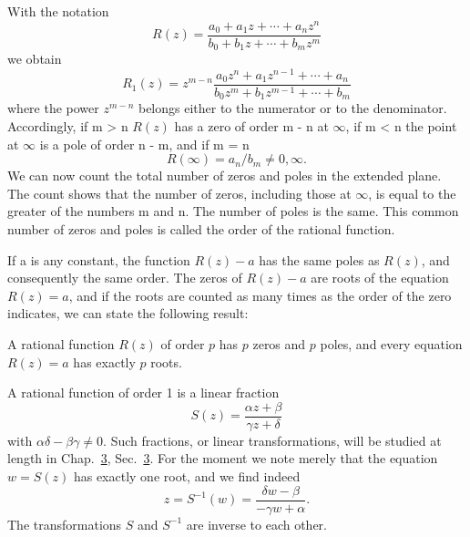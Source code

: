 With the notation
\begin{equation*}
R (z) = \frac {a _ {0} + a _ {1} z + \cdots + a _ {n} z ^ {n}}{b _ {0} + b _ {1} z + \cdots + b _ {m} z ^ {m}}
\end{equation*}
we obtain
\begin{equation*}
R _ {1} (z) = z ^ {m - n} \frac {a _ {0} z ^ {n} + a _ {1} z ^ {n - 1} + \cdots + a _ {n}}{b _ {0} z ^ {m} + b _ {1} z ^ {m - 1} + \cdots + b _ {m}}
\end{equation*}
where the power $z^{m-n}$ belongs either to the numerator or to the denominator. Accordingly, if m > n $R(z)$ has a zero of order m - n at $\infty$, if m < n the point at $\infty$ is a pole of order n - m, and if m = n
\begin{equation*}
R (\infty) = a _ {n} / b _ {m} \neq 0, \infty .
\end{equation*}
We can now count the total number of zeros and poles in the extended plane. The count shows that the number of zeros, including those at $\infty$, is equal to the greater of the numbers m and n. The number of poles is the same. This common number of zeros and poles is called the order of the rational function.

If a is any constant, the function $R(z) - a$ has the same poles as $R(z)$, and consequently the same order. The zeros of $R(z) - a$ are roots of the equation $R(z) = a$, and if the roots are counted as many times as the order of the zero indicates, we can state the following result:

A rational function $R(z)$ of order $p$ has $p$ zeros and $p$ poles, and every equation $R(z) = a$ has exactly $p$ roots.

A rational function of order 1 is a linear fraction
\begin{equation*}
S (z) = \frac {\alpha z + \beta}{\gamma z + \delta}
\end{equation*}
with $\alpha\delta - \beta\gamma \neq 0$. Such fractions, or linear transformations, will be studied at length in Chap.~\hyperref[chap:3]{3}, Sec.~\hyperref[sec:3.3]{3}. For the moment we note merely that the equation $w = S(z)$ has exactly one root, and we find indeed
\begin{equation*}
z = S ^ {- 1} (w) = \frac {\delta w - \beta}{- \gamma w + \alpha}.
\end{equation*}
The transformations $S$ and $S^{-1}$ are inverse to each other.

